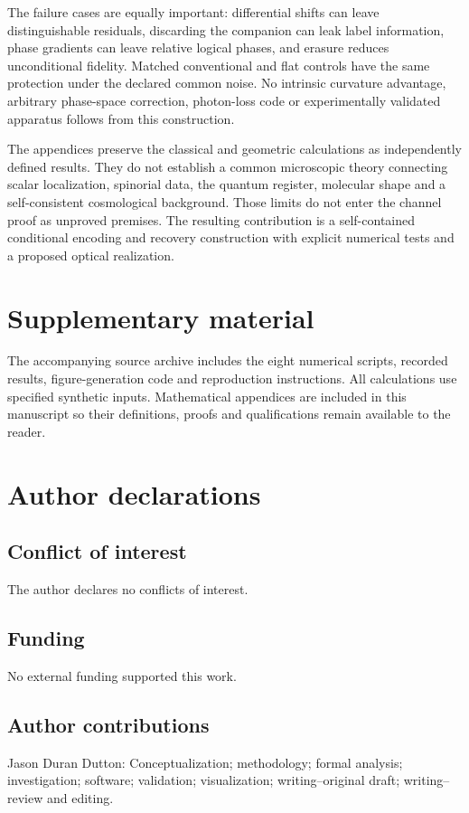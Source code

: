 \documentclass[aip,adv,reprint,onecolumn,amsmath,amssymb]{revtex4-2}
\begin{document}
The failure cases are equally important: differential shifts can leave distinguishable residuals, discarding the companion can leak label information, phase gradients can leave relative logical phases, and erasure reduces unconditional fidelity. Matched conventional and flat controls have the same protection under the declared common noise. No intrinsic curvature advantage, arbitrary phase-space correction, photon-loss code or experimentally validated apparatus follows from this construction.

The appendices preserve the classical and geometric calculations as independently defined results. They do not establish a common microscopic theory connecting scalar localization, spinorial data, the quantum register, molecular shape and a self-consistent cosmological background. Those limits do not enter the channel proof as unproved premises. The resulting contribution is a self-contained conditional encoding and recovery construction with explicit numerical tests and a proposed optical realization.

\section*{Supplementary material}
The accompanying source archive includes the eight numerical scripts, recorded results, figure-generation code and reproduction instructions. All calculations use specified synthetic inputs. Mathematical appendices are included in this manuscript so their definitions, proofs and qualifications remain available to the reader.

\section*{Author declarations}
\subsection*{Conflict of interest}
The author declares no conflicts of interest.
\subsection*{Funding}
No external funding supported this work.
\subsection*{Author contributions}
Jason Duran Dutton: Conceptualization; methodology; formal analysis; investigation; software; validation; visualization; writing--original draft; writing--review and editing.
\end{document}
